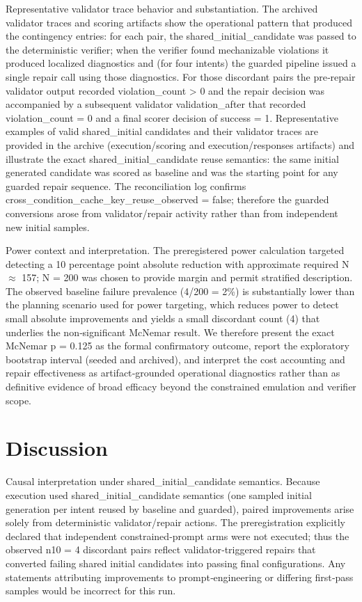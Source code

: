 \documentclass[conference]{IEEEtran}
\begin{document}
Representative validator trace behavior and substantiation. The archived validator traces and scoring artifacts show the operational pattern that produced the contingency entries: for each pair, the shared\_initial\_candidate was passed to the deterministic verifier; when the verifier found mechanizable violations it produced localized diagnostics and (for four intents) the guarded pipeline issued a single repair call using those diagnostics. For those discordant pairs the pre‑repair validator output recorded violation\_count > 0 and the repair decision was accompanied by a subsequent validator validation\_after that recorded violation\_count = 0 and a final scorer decision of success = 1. Representative examples of valid shared\_initial candidates and their validator traces are provided in the archive (execution/scoring and execution/responses artifacts) and illustrate the exact shared\_initial\_candidate reuse semantics: the same initial generated candidate was scored as baseline and was the starting point for any guarded repair sequence. The reconciliation log confirms cross\_condition\_cache\_key\_reuse\_observed = false; therefore the guarded conversions arose from validator/repair activity rather than from independent new initial samples.

Power context and interpretation. The preregistered power calculation targeted detecting a 10 percentage point absolute reduction with approximate required N \ensuremath{\approx} 157; N = 200 was chosen to provide margin and permit stratified description. The observed baseline failure prevalence (4/200 = 2\%) is substantially lower than the planning scenario used for power targeting, which reduces power to detect small absolute improvements and yields a small discordant count (4) that underlies the non‑significant McNemar result. We therefore present the exact McNemar p = 0.125 as the formal confirmatory outcome, report the exploratory bootstrap interval (seeded and archived), and interpret the cost accounting and repair effectiveness as artifact‑grounded operational diagnostics rather than as definitive evidence of broad efficacy beyond the constrained emulation and verifier scope.

\section{Discussion}
Causal interpretation under shared\_initial\_candidate semantics. Because execution used shared\_initial\_candidate semantics (one sampled initial generation per intent reused by baseline and guarded), paired improvements arise solely from deterministic validator/repair actions. The preregistration explicitly declared that independent constrained‑prompt arms were not executed; thus the observed n10 = 4 discordant pairs reflect validator‑triggered repairs that converted failing shared initial candidates into passing final configurations. Any statements attributing improvements to prompt‑engineering or differing first‑pass samples would be incorrect for this run.
\end{document}
